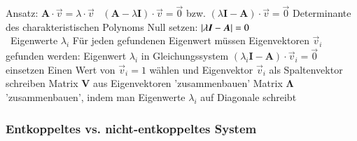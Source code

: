 \begin{outline}
    \1 Ansatz: $ \bm{A} \cdot \vec{v} = \lambda \cdot \vec{v}$ \textrightarrow\ $(\bm{A} - \lambda \bm{I}) \cdot \vec{v} = \vec{0}$ bzw. 
        $(\lambda \bm{I} - \bm{A}) \cdot \vec{v} = \vec{0}$
    \1 Determinante des charakteristischen Polynoms Null setzen: $\left|\lambda \bm{I} - \bm{A}\right| = 0$ \\
        \textrightarrow\ Eigenwerte $\lambda_i$ 
    \1 Für jeden gefundenen Eigenwert müssen Eigenvektoren $\vec{v}_i$ gefunden werden:
        \2 Eigenwert $\lambda_i$ in Gleichungssystem $(\lambda_i \bm{I} - \bm{A}) \cdot \vec{v}_i = \vec{0}$ einsetzen
        \2 Einen Wert von $\vec{v}_i = 1$ wählen und Eigenvektor $\vec{v}_i$ als Spaltenvektor schreiben
    \1 Matrix $\bm{V}$ aus Eigenvektoren 'zusammenbauen'
    \1 Matrix $\bm{\Lambda}$ 'zusammenbauen', indem man Eigenwerte $\lambda_i$ auf Diagonale schreibt
\end{outline}


\subsubsection{Entkoppeltes vs. nicht-entkoppeltes System}

